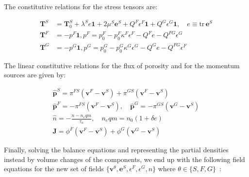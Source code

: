 \documentclass[twocolumn]{article}
\begin{document}
The constitutive relations for the stress tensors are:

\begin{align}
    \textbf{T}^S & = \textbf{T}_0^S + \lambda^Se\textbf{1} + 2\mu^S\textbf{e}^S + Q^F\epsilon^F\textbf{1} + Q^G\epsilon^G\textbf{1}, \quad e\equiv\textrm{tr}\,\textbf{e}^S \\
    \textbf{T}^F & = -p^F\textbf{1}, p^F = p_0^F - p_0^F\kappa^F\epsilon^F - Q^Fe - Q^{FG}\epsilon^G                                                                        \\
    \textbf{T}^G & = -p^G\textbf{1}, p^G = p_0^G - p_0^G\kappa^G\epsilon^G - Q^Ge - Q^{FG}\epsilon^F
\end{align}

The linear constitutive relations for the flux of porosity and for the momentum sources are given by:

\begin{gather}
    \hat{\textbf{p}}^S = \pi^{FS}(\textbf{v}^F - \textbf{v}^S) + \pi^{GS}(\textbf{v}^F - \textbf{v}^S)\\
    \hat{\textbf{p}}^F = -\pi^{FS}(\textbf{v}^F - \textbf{v}^S), \quad \hat{\textbf{p}}^G = -\pi^{GS}(\textbf{v}^G - \textbf{v}^S)\\
    \hat{n} = -\frac{n-n_eqm}{\tau_n}, \quad n_eqm = n_0(1+\delta{e})\\
    \textbf{J} = \phi^F(\textbf{v}^F - \textbf{v}^S) + \phi^G(\textbf{v}^G - \textbf{v}^S)
\end{gather}

Finally, solving the balance equations and representing the partial densities instead by volume changes of the components, we end up with the following field equations for the new set of fields $\{\textbf{v}^\theta, \textbf{e}^S, \epsilon^F, \epsilon^G, n\}$ where $\theta \in \{S, F, G\}$~\cite{detmann_num_sim_2008}:
\end{document}
